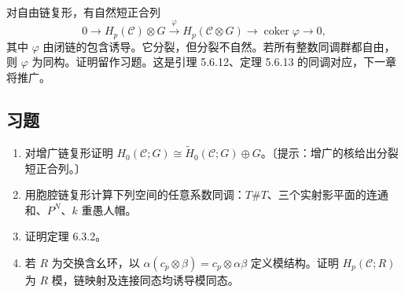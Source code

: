 对自由链复形，有自然短正合列
\[
0\to H_p(\mathcal C)\otimes G\xrightarrow{\varphi}H_p(\mathcal C\otimes G)\to\operatorname{coker}\varphi\to0,
\]
其中 $\varphi$ 由闭链的包含诱导。它分裂，但分裂不自然。若所有整数同调群都自由，则 $\varphi$ 为同构。证明留作习题。这是引理 5.6.12、定理 5.6.13 的同调对应，下一章将推广。

\subsection*{习题}
\begin{enumerate}
\item 对增广链复形证明 $H_0(\mathcal C;G)\cong\widetilde H_0(\mathcal C;G)\oplus G$。〔提示：增广的核给出分裂短正合列。〕
\item 用胞腔链复形计算下列空间的任意系数同调：$T\#T$、三个实射影平面的连通和、$P^N$、$k$ 重愚人帽。
\item 证明定理 6.3.2。
\item 若 $R$ 为交换含幺环，以 $\alpha(c_p\otimes\beta)=c_p\otimes\alpha\beta$ 定义模结构。证明 $H_p(\mathcal C;R)$ 为 $R$ 模，链映射及连接同态均诱导模同态。
\end{enumerate}

